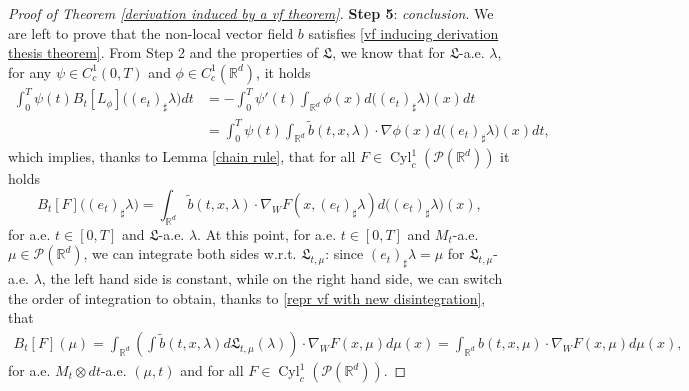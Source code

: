 \documentclass[10pt,leqno]{amsart}
\numberwithin{equation}{section}
\newcommand{\R}{\mathbb{R}}
\newcommand{\PP}{\mathcal{P}}
\begin{document}
\begin{proof}[Proof of Theorem \ref{derivation induced by a vf theorem}]
    \textbf{Step 5}: \textit{conclusion}. We are left to prove that the non-local vector field $b$ satisfies \eqref{vf inducing derivation thesis theorem}. From Step 2 and the properties of $\mathfrak{L}$, we know that for $\mathfrak{L}$-a.e. $\lambda$, for any $\psi\in C_c^1(0,T)$ and $\phi\in C_c^1(\R^d)$, it holds
    \begin{align*}
        \int_0^T \psi(t) B_t[L_\phi]\big((e_t)_\sharp \lambda\big) dt & = - \int_0^T \psi'(t)\int_{\R^d}\phi(x)d\big((e_t)_\sharp \lambda\big)(x) dt 
        \\
        & = \int_0^T \psi(t) \int_{\R^d} \tilde{b}(t,x,\lambda) \cdot \nabla \phi(x) d\big((e_t)_\sharp \lambda\big)(x) dt,
    \end{align*}
    which implies, thanks to Lemma \ref{chain rule}, that for all $F\in \operatorname{Cyl}_c^1(\PP(\R^d))$ it holds
    \[B_t[F]\big((e_t)_\sharp \lambda\big) = \int_{\R^d} \tilde{b}(t,x,\lambda)\cdot \nabla_WF(x,(e_t)_\sharp \lambda) d\big((e_t)_\sharp \lambda\big)(x),\]
    for a.e. $t\in [0,T]$ and $\mathfrak{L}$-a.e. $\lambda$. At this point, for a.e. $t\in [0,T]$ and $M_t$-a.e. $\mu\in \PP(\R^d)$, we can integrate both sides w.r.t. $\mathfrak{L}_{t,\mu}$: since $(e_t)_\sharp \lambda = \mu$ for $\mathfrak{L}_{t,\mu}$-a.e. $\lambda$, the left hand side is constant, while on the right hand side, we can switch the order of integration to obtain, thanks to \eqref{repr vf with new disintegration}, that
    \begin{align*}
        B_t[F](\mu) = \int_{\R^d} \left(\int \tilde{b}(t,x,\lambda) d\mathfrak{L}_{t,\mu}(\lambda)\right)\cdot \nabla_W F(x,\mu) d\mu(x)
        = 
        \int_{\R^d} b(t,x,\mu) \cdot \nabla_W F(x,\mu) d\mu(x),
    \end{align*}
    for a.e. $M_t\otimes dt$-a.e. $(\mu,t)$ and for all $F\in \operatorname{Cyl}_c^1(\PP(\R^d))$.
    \end{proof}
\end{document}
